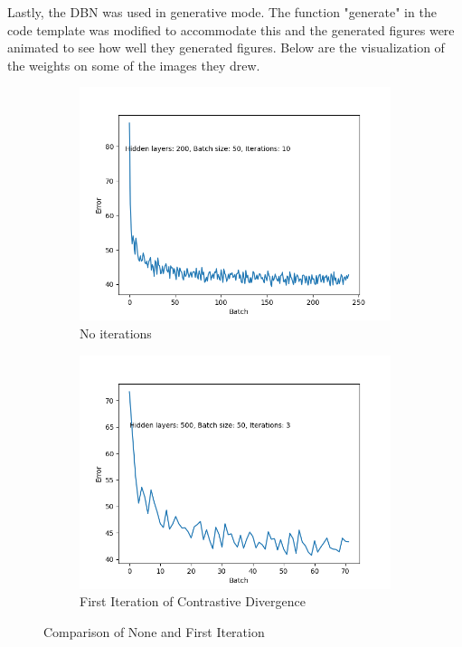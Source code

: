 \documentclass[a4paper]{article}
\begin{document}
Lastly, the DBN was used in generative mode. The function "generate" in the code template was modified to accommodate this and the generated figures were animated to see how well they generated figures. Below are the visualization of the weights on some of the images they drew.

\begin{figure}[htb]
    \centering
    \begin{subfigure}[b]{0.45\textwidth}
        \centering
        \includegraphics[width=\textwidth]{Labs/Lab 4/Rakin/plots/Hidden_layers_200_batch_50_iterations_10.png}
        \caption{No iterations}
        \label{fig:Lab4-iter1}
    \end{subfigure}
    \begin{subfigure}[b]{0.45\textwidth}
        \centering
        \includegraphics[width=\textwidth]{Labs/Lab 4/Rakin/plots/Hidden_layers_500_batch_50_iterations_3.png}
        \caption{First Iteration of Contrastive Divergence}
        \label{fig:Lab4-iter2}
    \end{subfigure}
    \caption{Comparison of None and First Iteration}
    \label{fig:Lab4-comparison-hiddenNodes}
\end{figure}
\end{document}
